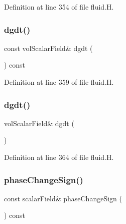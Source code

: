 Definition at line 354 of file fluid.\+H.

\mbox{\label{classFoam_1_1fluid_afedabe4abe19bcb26376d6790dc697ed}} 
\subsubsection{\texorpdfstring{dgdt()}{dgdt()}\hspace{0.1cm}{\footnotesize\ttfamily [1/2]}}
{\footnotesize\ttfamily const vol\+Scalar\+Field\& dgdt (\begin{DoxyParamCaption}{ }\end{DoxyParamCaption}) const\hspace{0.3cm}{\ttfamily [inline]}}



Definition at line 359 of file fluid.\+H.

\mbox{\label{classFoam_1_1fluid_ad22a982fd906a6b6688870b9f3f4d00c}} 
\subsubsection{\texorpdfstring{dgdt()}{dgdt()}\hspace{0.1cm}{\footnotesize\ttfamily [2/2]}}
{\footnotesize\ttfamily vol\+Scalar\+Field\& dgdt (\begin{DoxyParamCaption}{ }\end{DoxyParamCaption})\hspace{0.3cm}{\ttfamily [inline]}}



Definition at line 364 of file fluid.\+H.

\mbox{\label{classFoam_1_1fluid_acfbd44525404ff7c6c10c1f48107e218}} 
\subsubsection{\texorpdfstring{phase\+Change\+Sign()}{phaseChangeSign()}\hspace{0.1cm}{\footnotesize\ttfamily [1/2]}}
{\footnotesize\ttfamily const scalar\+Field\& phase\+Change\+Sign (\begin{DoxyParamCaption}{ }\end{DoxyParamCaption}) const\hspace{0.3cm}{\ttfamily [inline]}}



